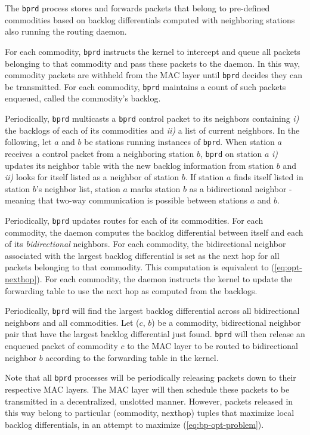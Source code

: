 \documentclass{article}
\newcommand{\bprd}{\texttt{bprd}\xspace}
\begin{document}
The \bprd process stores and forwards packets that belong to pre-defined commodities based on backlog differentials computed with neighboring stations also running the routing daemon.


For each commodity, \bprd instructs the kernel to intercept and queue all packets belonging to that commodity and pass these packets to the daemon.
In this way, commodity packets are withheld from the MAC layer until \bprd decides they can be transmitted.
For each commodity, \bprd maintains a count of such packets enqueued, called the commodity's backlog.


Periodically, \bprd multicasts a \bprd control packet to its neighbors containing \emph{i)} the backlogs of each of its commodities and \emph{ii)} a list of current neighbors.
In the following, let \(a\) and \(b\) be stations running instances of \bprd.
When station \(a\) receives a control packet from a neighboring station \(b\), \bprd on station \(a\) \emph{i)} updates its neighbor table with the new backlog information from station \(b\) and \emph{ii)} looks for itself listed as a neighbor of station \(b\).
If station \(a\) finds itself listed in station \(b\)'s neighbor list, station \(a\) marks station \(b\) as a bidirectional neighbor - meaning that two-way communication is possible between stations \(a\) and \(b\).


Periodically, \bprd updates routes for each of its commodities.
For each commodity, the daemon computes the backlog differential between itself and each of its \emph{bidirectional} neighbors.
For each commodity, the bidirectional neighbor associated with the largest backlog differential is set as the next hop for all packets belonging to that commodity.
This computation is equivalent to (\ref{eq:opt-nexthop}).
For each commodity, the daemon instructs the kernel to update the forwarding table to use the next hop as computed from the backlogs.


Periodically, \bprd will find the largest backlog differential across all bidirectional neighbors and all commodities.
Let (\(c\), \(b\)) be a commodity, bidirectional neighbor pair that have the largest backlog differential just found.
\bprd will then release an enqueued packet of commodity \(c\) to the MAC layer to be routed to bidirectional neighbor \(b\) according to the forwarding table in the kernel.


Note that all \bprd processes will be periodically releasing packets down to their respective MAC layers.
The MAC layer will then schedule these packets to be transmitted in a decentralized, unslotted manner.
However, packets released in this way belong to particular (commodity, nexthop) tuples that maximize local backlog differentials, in an attempt to maximize (\ref{eq:bp-opt-problem}).
\end{document}

